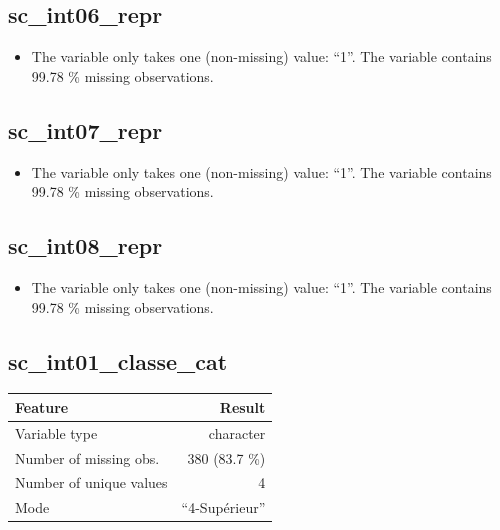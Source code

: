 \documentclass[
  letterpaper,
  DIV=11,
  numbers=noendperiod]{scrartcl}
\providecommand{\tightlist}{%
  \setlength{\itemsep}{0pt}\setlength{\parskip}{0pt}}
\begin{document}
\subsection{sc\_int06\_repr}\label{sc_int06_repr}

\begin{itemize}
\tightlist
\item
  The variable only takes one (non-missing) value: ``1''. The variable
  contains 99.78 \% missing observations.
\end{itemize}

\fullline

\subsection{sc\_int07\_repr}\label{sc_int07_repr}

\begin{itemize}
\tightlist
\item
  The variable only takes one (non-missing) value: ``1''. The variable
  contains 99.78 \% missing observations.
\end{itemize}

\fullline

\subsection{sc\_int08\_repr}\label{sc_int08_repr}

\begin{itemize}
\tightlist
\item
  The variable only takes one (non-missing) value: ``1''. The variable
  contains 99.78 \% missing observations.
\end{itemize}

\fullline

\subsection{sc\_int01\_classe\_cat}\label{sc_int01_classe_cat}

\bminione

\begin{longtable}[]{@{}lr@{}}
\toprule\noalign{}
Feature & Result \\
\midrule\noalign{}
\endhead
\bottomrule\noalign{}
\endlastfoot
Variable type & character \\
Number of missing obs. & 380 (83.7 \%) \\
Number of unique values & 4 \\
Mode & ``4-Supérieur'' \\
\end{longtable}
\end{document}
